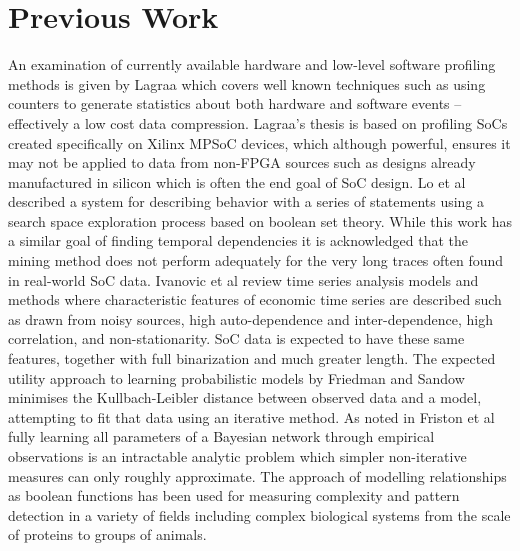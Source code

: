 \documentclass[runningheads]{llncs}
\begin{document}

\section{Previous Work} %
\label{sec:previouswork}

An examination of currently available hardware and low-level software
profiling methods is given by Lagraa\cite{LagraaThesis} which covers well known
techniques such as using counters to generate statistics about both
hardware and software events -- effectively a low cost data compression.
Lagraa's thesis is based on profiling \gls{SoC}s created specifically on
Xilinx MPSoC devices, which although powerful, ensures it may not be applied to
data from non-\gls{FPGA} sources such as designs already manufactured in
silicon which is often the end goal of \gls{SoC} design.
Lo et al\cite{MiningPastTemporalRules} described a system for describing
behavior with a series of statements using a search space exploration process
based on boolean set theory.
While this work has a similar goal of finding temporal dependencies it is
acknowledged that the mining method does not perform adequately for the very
long traces often found in real-world \gls{SoC} data.
Ivanovic et al\cite{IvanovicKurbalija2016} review time series
analysis models and methods where characteristic features of economic time
series are described such as drawn from noisy sources, high auto-dependence
and inter-dependence, high correlation, and non-stationarity.
\gls{SoC} data is expected to have these same features, together with
full binarization and much greater length.
The expected utility approach to learning probabilistic models by Friedman and
Sandow\cite{LearningProbabilisticModels} minimises the Kullbach-Leibler
distance between observed data and a model, attempting to fit that data using
an iterative method.
As noted in Friston et al\cite{BayesModelReduct} fully learning all parameters
of a Bayesian network through empirical observations is an intractable analytic
problem which simpler non-iterative measures can only roughly approximate.
The approach of modelling relationships as boolean functions has been used for
measuring complexity and pattern detection in a variety of fields including
complex biological systems from the scale of proteins to groups of
animals\cite{TkacikBialek2014}.
\end{document}
